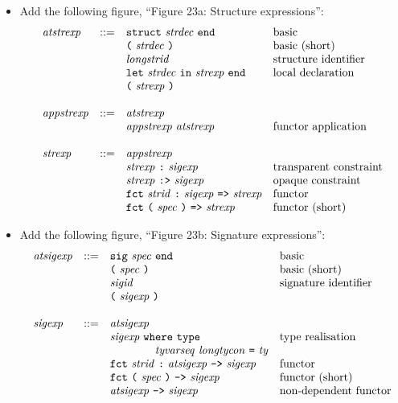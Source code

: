 \documentclass[twoside,titlepage]{article}
\begin{document}
\begin{appendix}
\begin{itemize}
\item Add the following figure, ``Figure 23a: Structure expressions'':
  $$
  \begin{array}{llll}
  \mathit{atstrexp} & ::= & {\tt{struct}}~\mathit{strdec}~{\tt{end}} & \textrm{basic} \\
  && \mbox{\tt(}~\mathit{strdec}~\mbox{\tt)} & \textrm{basic (short)} \\
  && \mathit{longstrid} & \textrm{structure identifier} \\
  && {\tt{let}}~\mathit{strdec}~{\tt{in}}~\mathit{strexp}~{\tt{end}} & \textrm{local declaration} \\
  && \mbox{\tt(}~\mathit{strexp}~\mbox{\tt)} \\
  \\
  \mathit{appstrexp} & ::= & \mathit{atstrexp} \\
  && \mathit{appstrexp}~\mathit{atstrexp} & \textrm{functor application} \\
  \\
  \mathit{strexp} & ::= & \mathit{appstrexp} \\
  && \mathit{strexp}~\mbox{\tt:}~\mathit{sigexp} & \textrm{transparent constraint} \\
  && \mathit{strexp}~\mbox{\tt:>}~\mathit{sigexp} & \textrm{opaque constraint} \\
  && {\tt{fct}}~\mathit{strid}~\mbox{\tt:}~\mathit{sigexp}~\mbox{\tt=>}~\mathit{strexp} & \textrm{functor} \\
  && {\tt{fct}}~\mbox{\tt(}~\mathit{spec}~\mbox{\tt)}~\mbox{\tt=>}~\mathit{strexp} & \textrm{functor (short)} \\
  \end{array}
  $$

\item Add the following figure, ``Figure 23b: Signature expressions'':
  $$
  \begin{array}{llll}
  \mathit{atsigexp} & ::= & {\tt{sig}}~\mathit{spec}~{\tt{end}} & \textrm{basic} \\
  && \mbox{\tt(}~\mathit{spec}~\mbox{\tt)} & \textrm{basic (short)} \\
  && \mathit{sigid} & \textrm{signature identifier} \\
  && \mbox{\tt(}~\mathit{sigexp}~\mbox{\tt)} \\
  \\
  \mathit{sigexp} & ::= & \mathit{atsigexp} \\
  && \mathit{sigexp}~{\tt{where}}~{\tt{type}} & \textrm{type realisation} \\
  && ~~~~~~~~~~~~\mathit{tyvarseq}~\mathit{longtycon}~\mbox{\tt=}~\mathit{ty} \\
  && {\tt{fct}}~\mathit{strid}~\mbox{\tt:}~\mathit{atsigexp}~\mbox{\tt->}~\mathit{sigexp} & \textrm{functor} \\
  && {\tt{fct}}~\mbox{\tt(}~\mathit{spec}~\mbox{\tt)}~\mbox{\tt->}~\mathit{sigexp} & \textrm{functor (short)} \\
  && \mathit{atsigexp}~\mbox{\tt->}~\mathit{sigexp} & \textrm{non-dependent functor} \\
  \end{array}
  $$


\end{itemize}
\end{appendix}
\end{document}
